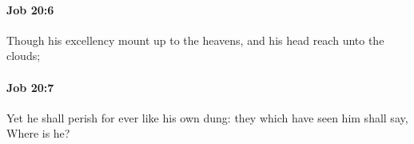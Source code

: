 		\paragraph{Job 20:6} %
			\label{JOB-20-6}

			Though his excellency mount up to the heavens, and his head reach unto the clouds;


		\paragraph{Job 20:7} %
			\label{JOB-20-7}

			Yet he shall perish for ever like his own dung: they which have seen him shall say, Where is he?


